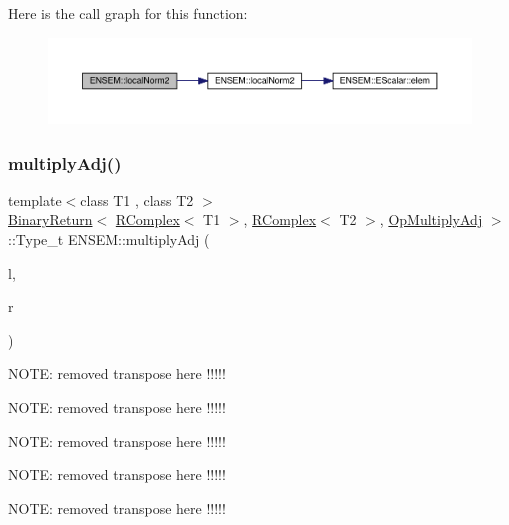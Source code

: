 Here is the call graph for this function\+:\nopagebreak
\begin{figure}[H]
\begin{center}
\leavevmode
\includegraphics[width=350pt]{da/dc7/group__rcomplex_gaeb6b484f4bb6decc4552e2c635452b3f_cgraph}
\end{center}
\end{figure}
\mbox{\label{group__rcomplex_ga7147ce299498e423c79851ee598dcde3}} 
\subsubsection{\texorpdfstring{multiplyAdj()}{multiplyAdj()}}
{\footnotesize\ttfamily template$<$class T1 , class T2 $>$ \\
\mbox{\hyperlink{structENSEM_1_1BinaryReturn}{Binary\+Return}}$<$ \mbox{\hyperlink{classENSEM_1_1RComplex}{R\+Complex}}$<$ T1 $>$, \mbox{\hyperlink{classENSEM_1_1RComplex}{R\+Complex}}$<$ T2 $>$, \mbox{\hyperlink{structENSEM_1_1OpMultiplyAdj}{Op\+Multiply\+Adj}} $>$\+::Type\+\_\+t E\+N\+S\+E\+M\+::multiply\+Adj (\begin{DoxyParamCaption}\item[{const \mbox{\hyperlink{classENSEM_1_1RComplex}{R\+Complex}}$<$ T1 $>$ \&}]{l,  }\item[{const \mbox{\hyperlink{classENSEM_1_1RComplex}{R\+Complex}}$<$ T2 $>$ \&}]{r }\end{DoxyParamCaption})\hspace{0.3cm}{\ttfamily [inline]}}

N\+O\+TE\+: removed transpose here !!!!!

N\+O\+TE\+: removed transpose here !!!!!

N\+O\+TE\+: removed transpose here !!!!!

N\+O\+TE\+: removed transpose here !!!!!

N\+O\+TE\+: removed transpose here !!!!! \mbox{\label{group__rcomplex_gab6d38d52433e94dc9aedbb69f2463255}} 

